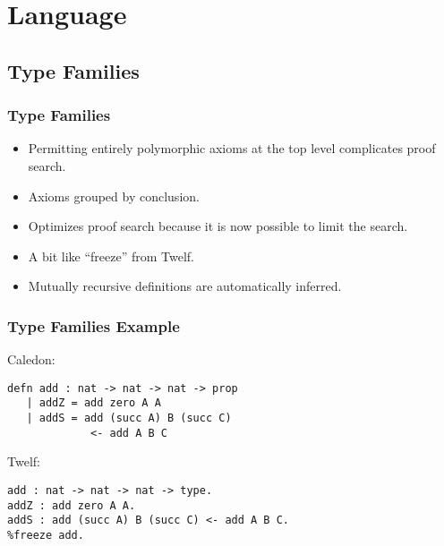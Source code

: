 \section{Language}

\subsection[Families]{Type Families}
\begin{frame}
\frametitle{Type Families}
\begin{itemize}
\item Permitting entirely polymorphic axioms at the top level complicates proof search.
\item Axioms grouped by conclusion.
\item Optimizes proof search because it is now possible to limit the search.
\item A bit like ``freeze'' from Twelf.  
\item Mutually recursive definitions are automatically inferred.
\end{itemize}
\end{frame}

\begin{frame}[fragile]
\frametitle{Type Families Example}

Caledon:

\begin{lstlisting}
defn add : nat -> nat -> nat -> prop
   | addZ = add zero A A
   | addS = add (succ A) B (succ C) 
             <- add A B C
\end{lstlisting}

Twelf:

\begin{lstlisting}
add : nat -> nat -> nat -> type.
addZ : add zero A A.
addS : add (succ A) B (succ C) <- add A B C.
%freeze add.
\end{lstlisting}
\end{frame}


